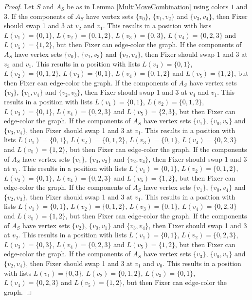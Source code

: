 \documentclass[12pt]{amsart}
\theoremstyle{plain}
\theoremstyle{definition}
\theoremstyle{remark}
\begin{document}
\begin{proof}
Let $S$ and $A_S$ be as in Lemma \ref{MultiMoveCombination} using colors $1$ and $3$. If the components of $A_S$ have vertex sets $\{v_0\}$, $\{v_1, v_2\}$ and $\{v_3, v_4\}$, then Fixer should swap 1 and 3 at $v_2$ and $v_1$. This results in a position with lists $L(v_1) = \{0, 1\}$, $L(v_2) = \{0, 1, 2\}$, $L(v_3) = \{0, 3\}$, $L(v_4) = \{0, 2, 3\}$ and $L(v_5) = \{1, 2\}$, but then Fixer can edge-color the graph.
If the components of $A_S$ have vertex sets $\{v_0\}$, $\{v_1, v_3\}$ and $\{v_2, v_4\}$, then Fixer should swap 1 and 3 at $v_3$ and $v_1$. This results in a position with lists $L(v_1) = \{0, 1\}$, $L(v_2) = \{0, 1, 2\}$, $L(v_3) = \{0, 1\}$, $L(v_4) = \{0, 1, 2\}$ and $L(v_5) = \{1, 2\}$, but then Fixer can edge-color the graph.
If the components of $A_S$ have vertex sets $\{v_0\}$, $\{v_1, v_4\}$ and $\{v_2, v_3\}$, then Fixer should swap 1 and 3 at $v_4$ and $v_1$. This results in a position with lists $L(v_1) = \{0, 1\}$, $L(v_2) = \{0, 1, 2\}$, $L(v_3) = \{0, 1\}$, $L(v_4) = \{0, 2, 3\}$ and $L(v_5) = \{2, 3\}$, but then Fixer can edge-color the graph.
If the components of $A_S$ have vertex sets $\{v_1\}$, $\{v_0, v_2\}$ and $\{v_3, v_4\}$, then Fixer should swap 1 and 3 at $v_1$. This results in a position with lists $L(v_1) = \{0, 1\}$, $L(v_2) = \{0, 1, 2\}$, $L(v_3) = \{0, 1\}$, $L(v_4) = \{0, 2, 3\}$ and $L(v_5) = \{1, 2\}$, but then Fixer can edge-color the graph.
If the components of $A_S$ have vertex sets $\{v_1\}$, $\{v_0, v_3\}$ and $\{v_2, v_4\}$, then Fixer should swap 1 and 3 at $v_1$. This results in a position with lists $L(v_1) = \{0, 1\}$, $L(v_2) = \{0, 1, 2\}$, $L(v_3) = \{0, 1\}$, $L(v_4) = \{0, 2, 3\}$ and $L(v_5) = \{1, 2\}$, but then Fixer can edge-color the graph.
If the components of $A_S$ have vertex sets $\{v_1\}$, $\{v_0, v_4\}$ and $\{v_2, v_3\}$, then Fixer should swap 1 and 3 at $v_1$. This results in a position with lists $L(v_1) = \{0, 1\}$, $L(v_2) = \{0, 1, 2\}$, $L(v_3) = \{0, 1\}$, $L(v_4) = \{0, 2, 3\}$ and $L(v_5) = \{1, 2\}$, but then Fixer can edge-color the graph.
If the components of $A_S$ have vertex sets $\{v_2\}$, $\{v_0, v_1\}$ and $\{v_3, v_4\}$, then Fixer should swap 1 and 3 at $v_2$. This results in a position with lists $L(v_1) = \{0, 1\}$, $L(v_2) = \{0, 2, 3\}$, $L(v_3) = \{0, 3\}$, $L(v_4) = \{0, 2, 3\}$ and $L(v_5) = \{1, 2\}$, but then Fixer can edge-color the graph.
If the components of $A_S$ have vertex sets $\{v_3\}$, $\{v_0, v_1\}$ and $\{v_2, v_4\}$, then Fixer should swap 1 and 3 at $v_1$ and $v_0$. This results in a position with lists $L(v_1) = \{0, 3\}$, $L(v_2) = \{0, 1, 2\}$, $L(v_3) = \{0, 1\}$, $L(v_4) = \{0, 2, 3\}$ and $L(v_5) = \{1, 2\}$, but then Fixer can edge-color the graph.

\end{proof}
\end{document}
